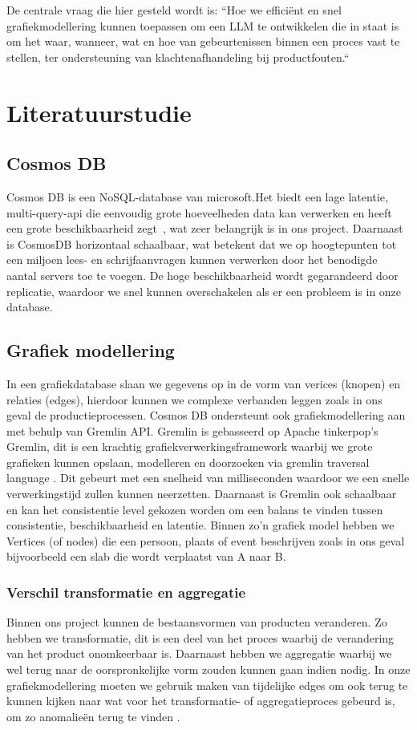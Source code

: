 De centrale vraag die hier gesteld wordt is: ``Hoe we efficiënt en snel grafiekmodellering kunnen toepassen om een LLM te ontwikkelen die in staat is om het waar, wanneer, wat en hoe van gebeurtenissen binnen een proces vast te stellen, ter ondersteuning van klachtenafhandeling bij productfouten.``
\section{Literatuurstudie}%
\label{sec:literatuurstudie}

\subsection{Cosmos DB}%
Cosmos DB is een NoSQL-database van microsoft.Het biedt een lage latentie, multi-query-api die eenvoudig grote hoeveelheden data kan verwerken en heeft een grote beschikbaarheid zegt~\textcite{Put2020}, wat zeer belangrijk is in ons project.
Daarnaast is CosmosDB horizontaal schaalbaar, wat betekent dat we op hoogtepunten tot een miljoen lees- en schrijfaanvragen kunnen verwerken door het benodigde aantal servers toe te voegen.
De hoge beschikbaarheid wordt gegarandeerd door replicatie, waardoor we snel kunnen overschakelen als er een probleem is in onze database.

\subsection{Grafiek modellering}
In een grafiekdatabase slaan we gegevens op in de vorm van verices (knopen) en relaties (edges), hierdoor kunnen we complexe verbanden leggen zoals in ons geval de productieprocessen.
Cosmos DB ondersteunt ook grafiekmodellering aan met behulp van Gremlin API. Gremlin is gebasseerd op Apache tinkerpop's Gremlin, dit is een krachtig grafiekverwerkingsframework waarbij we grote grafieken kunnen opslaan, modelleren en doorzoeken via gremlin traversal language \autocite{Microsoft2024}.
Dit gebeurt met een snelheid van milliseconden waardoor we een snelle verwerkingstijd zullen kunnen neerzetten.
Daarnaast is Gremlin ook schaalbaar en kan het consistentie level gekozen worden om een balans te vinden tussen consistentie, beschikbaarheid en latentie.
Binnen zo'n grafiek model hebben we Vertices (of nodes) die een persoon, plaats of event beschrijven zoals in ons geval bijvoorbeeld een slab die wordt verplaatst van A naar B.

\subsubsection{Verschil transformatie en aggregatie}
Binnen ons project kunnen de bestaansvormen van producten veranderen. Zo hebben we transformatie, dit is een deel van het proces waarbij de verandering van het product onomkeerbaar is.
Daarnaast hebben we aggregatie waarbij we wel terug naar de oorspronkelijke vorm zouden kunnen gaan indien nodig.
In onze grafiekmodellering moeten we gebruik maken van tijdelijke edges om ook terug te kunnen kijken naar wat voor het transformatie- of aggregatieproces gebeurd is, om zo anomalieën terug te vinden \autocite{JaewookByun2020}.

